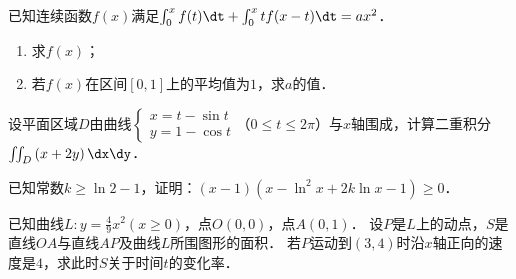 \documentclass[plain,noanswer,medmath]{../../template/jnuexam}
\begin{document}




\begin{problem}[points=10]
已知连续函数$f(x)$满足$\int_0^x f(t)\dt + \int_0^x tf(x - t)\dt = ax^2$．
\begin{enumerate}
\item 求$f(x)$；
\item 若$f(x)$在区间$[0,1]$上的平均值为$1$，求$a$的值．
\end{enumerate}
\end{problem}


\begin{problem}[points=10]
设平面区域$D$由曲线$\begin{cases}
  x = t - \sin t \\
  y = 1 - \cos t
\end{cases}$（$0 \le t \le 2\pi$）与$x$轴围成，计算二重积分$\iint_D \left(x + 2y \right)\dx\dy$．
\end{problem}


\begin{problem}[points=10]
已知常数$k \ge \ln 2 - 1$，证明：$(x - 1)\left(x - \ln^2 x + 2k\ln x - 1 \right) \ge 0$．
\end{problem}




\begin{problem}[points=11]
已知曲线$L:y = \frac{4}{9}x^2\left(x \ge 0 \right)$，点$O\left(0,0 \right)$，点$A\left(0,1 \right)$．
设$P$是$L$上的动点，$S$是直线$OA$与直线$AP$及曲线$L$所围图形的面积．
若$P$运动到$\left(3,4 \right)$时沿$x$轴正向的速度是$4$，求此时$S$关于时间$t$的变化率．
\end{problem}






\end{document}
